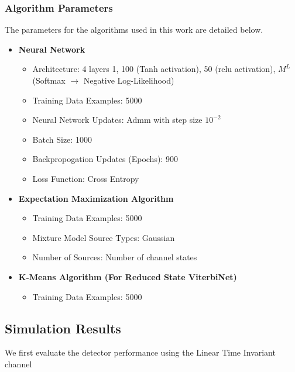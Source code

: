 \documentclass[12pt,a4paper]{report}
\begin{document}
\subsubsection{Algorithm Parameters}
The parameters for the algorithms used in this work are detailed below.
\begin{itemize}
\item \textbf{Neural Network}
\begin{itemize}
\item Architecture: 4 layers {1, 100 (Tanh activation), 50 (relu activation), $M^L$ (Softmax $\rightarrow$ Negative Log-Likelihood)}
\item Training Data Examples: 5000
\item Neural Network Updates: Admm \cite{kingma2014adam} with step size $10^{-2}$ 
\item Batch Size: 1000 
\item Backpropogation Updates (Epochs): 900
\item Loss Function: Cross Entropy
\end{itemize}
\item \textbf{Expectation Maximization Algorithm}
\begin{itemize}
\item Training Data Examples: 5000
\item Mixture Model Source Types: Gaussian
\item Number of Sources: Number of channel states
\end{itemize}
\item \textbf{K-Means Algorithm (For Reduced State ViterbiNet)}
\begin{itemize}
\item Training Data Examples: 5000
\end{itemize}
\end{itemize}


\subsection{Simulation Results}
We first evaluate the detector performance using the Linear Time Invariant channel
\end{document}
